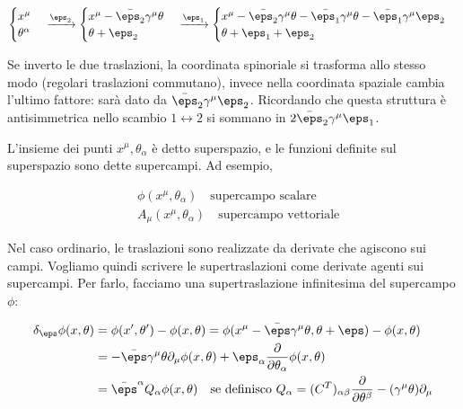 \documentclass{report}
\begin{document}
\begin{align}
    \begin{cases}
        x^\mu \\ \theta^\alpha
    \end{cases} \xrightarrow{\eps_2} \begin{cases}
        x^\mu - \bar{\eps_2}\gamma^\mu \theta \\ \theta + \eps_2 
    \end{cases} \xrightarrow{\eps_1} \begin{cases}
        x^\mu -\bar{\eps_2}\gamma^\mu \theta -\bar{\eps_1}\gamma^\mu \theta - \bar{\eps_1}\gamma^\mu \eps_2 \\ \theta + \eps_1 + \eps_2
    \end{cases}
\end{align}

Se inverto le due traslazioni, la coordinata spinoriale si trasforma allo stesso modo (regolari traslazioni commutano), invece nella coordinata spaziale cambia l'ultimo fattore: sarà dato da \(\bar{\eps}_2 \gamma^\mu \eps_2\). Ricordando che questa struttura è antisimmetrica nello scambio \(1 \leftrightarrow 2\) si sommano in \(2\bar{\eps}_2 \gamma^\mu \eps_1\). 

L'insieme dei punti \(x^\mu, \theta_\alpha\) è detto superspazio, e le funzioni definite sul superspazio sono dette supercampi. Ad esempio, 

\begin{align}
    &\phi(x^\mu, \theta_\alpha) \quad \text{supercampo scalare} \\ 
    &A_\mu(x^\mu, \theta_\alpha) \quad \text{supercampo vettoriale}
\end{align}

Nel caso ordinario, le traslazioni sono realizzate da derivate che agiscono sui campi. Vogliamo quindi scrivere le supertraslazioni come derivate agenti sui supercampi. Per farlo, facciamo una supertraslazione infinitesima del supercampo \(\phi\): 

\begin{align}
    \delta_\eps \phi (x, \theta) &= \phi(x', \theta') - \phi(x, \theta) = \phi(x^\mu-\bar{\eps}\gamma^\mu \theta, \theta + \eps) - \phi(x, \theta) \notag \\ 
    &= -\bar{\eps}\gamma^\mu \theta \partial_\mu \phi(x, \theta) + \eps_\alpha \frac{\partial}{\partial \theta_\alpha}\phi(x, \theta) \notag \\ 
    &=\bar{\eps}^\alpha Q_\alpha \phi(x, \theta) \quad \text{se definisco  } Q_\alpha = (C^T)_{\alpha\beta}\frac{\partial}{\partial \theta^\beta} - (\gamma^\mu \theta)\partial_\mu
\end{align}
\end{document}
